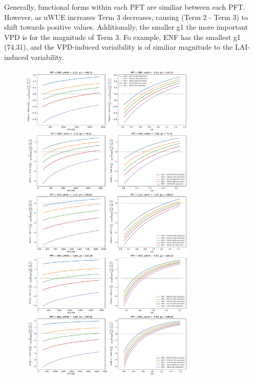 \documentclass[draft,linenumbers]{agujournal}
\begin{document}
Generally, functional forms within each PFT are similiar between each PFT. However, as uWUE increases Term 3 decreases, causing (Term 2 - Term 3) to shift towards positive values. Additionally, the smaller g1 the more important VPD is for the magnitude of Term 3. Fo example, ENF has the smallest g1 (74.31), and the VPD-induced variaibility is of similiar magnitude to the LAI-induced variability. 

 
\begin{figure}[h]
\centering
\includegraphics[width=20pc]{./fig05.pdf}
\caption{}
\label{term3_within}
\end{figure}
\end{document}
